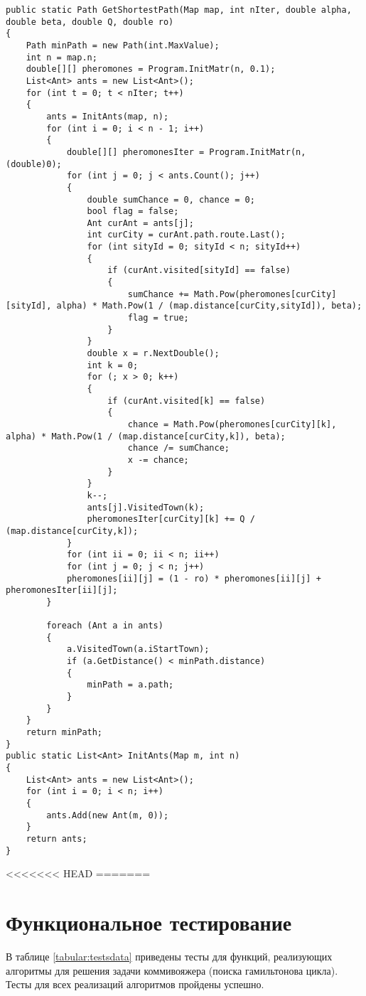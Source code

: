 \begin{center}
\begin{lstlisting}[label=l2, caption={Реализация муравьиного алгоритма}]
     public static Path GetShortestPath(Map map, int nIter, double alpha, double beta, double Q, double ro)
{
	Path minPath = new Path(int.MaxValue);
	int n = map.n;
	double[][] pheromones = Program.InitMatr(n, 0.1);
	List<Ant> ants = new List<Ant>();
	for (int t = 0; t < nIter; t++)
	{
		ants = InitAnts(map, n);
		for (int i = 0; i < n - 1; i++)
		{
			double[][] pheromonesIter = Program.InitMatr(n, (double)0); 
			for (int j = 0; j < ants.Count(); j++) 
			{
				double sumChance = 0, chance = 0;
				bool flag = false;
				Ant curAnt = ants[j];
				int curCity = curAnt.path.route.Last();
				for (int sityId = 0; sityId < n; sityId++) 
				{
					if (curAnt.visited[sityId] == false)
					{
						sumChance += Math.Pow(pheromones[curCity][sityId], alpha) * Math.Pow(1 / (map.distance[curCity,sityId]), beta); 
						flag = true;
					}
				}
				double x = r.NextDouble();
				int k = 0;
				for (; x > 0; k++)
				{
					if (curAnt.visited[k] == false)
					{
						chance = Math.Pow(pheromones[curCity][k], alpha) * Math.Pow(1 / (map.distance[curCity,k]), beta);
						chance /= sumChance;
						x -= chance;
					}
				}
				k--;
				ants[j].VisitedTown(k);
				pheromonesIter[curCity][k] += Q / (map.distance[curCity,k]);
			}
			for (int ii = 0; ii < n; ii++)
			for (int j = 0; j < n; j++)
			pheromones[ii][j] = (1 - ro) * pheromones[ii][j] + pheromonesIter[ii][j];
		}
		
		foreach (Ant a in ants)
		{
			a.VisitedTown(a.iStartTown);
			if (a.GetDistance() < minPath.distance)
			{
				minPath = a.path;
			}
		}                
	}
	return minPath;
}
public static List<Ant> InitAnts(Map m, int n)
{
	List<Ant> ants = new List<Ant>();
	for (int i = 0; i < n; i++)
	{
		ants.Add(new Ant(m, 0));
	}
	return ants;
}
\end{lstlisting}
\end{center}
<<<<<<< HEAD
=======
\section{Функциональное тестирование}
В таблице \ref{tabular:testsdata} приведены тесты для функций, реализующих алгоритмы для решения задачи коммивояжера (поиска гамильтонова цикла). Тесты для всех реализаций алгоритмов пройдены успешно.

